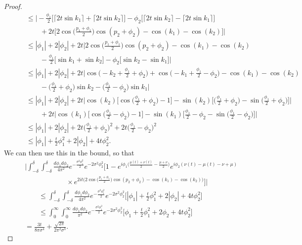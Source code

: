 \documentclass[../thesis-main/thesis-main]{subfiles}
\begin{document}
\begin{proof}
\begin{align}
  & \qquad \leq \bigg|-\frac{\phi_1}{2} \big[ \lceil 2 t \sin k_1\rceil + \lceil 2t \sin k_2\rceil \big] - \phi_2 \big[ \lceil 2 t \sin k_2\rceil - \lceil 2t \sin k_1\rceil\big]  \nonumber\\
  &\qquad \qquad + 2 t \Big[ 2 \cos\Big( \frac{p_1 +\phi_1}{2}\Big) \cos(p_2 + \phi_2) - \cos(k_1) - \cos(k_2) \Big]\bigg|\\
  & \qquad \leq |\phi_1| + 2 |\phi_2| + 2 t \bigg| 2\cos\Big( \frac{p_1 +\phi_1}{2}\Big) \cos(p_2 + \phi_2) - \cos(k_1) - \cos(k_2)  \nonumber\\
  & \qquad \qquad - \frac{\phi_1}{2} \big[ \sin k_1 +   \sin k_2\big] - \phi_2 \big[  \sin k_2 -  \sin k_1\big]\bigg|\\
  &  \qquad \leq |\phi_1| + 2 |\phi_2| + 2 t \bigg| \cos\Big(- k_2 + \frac{\phi_1}{2} + \phi_2 \Big)  + \cos\Big(- k_1 + \frac{\phi_1}{2} - \phi_2 \Big)- \cos(k_1) - \cos(k_2)  \nonumber\\
  & \qquad \qquad - \Big(\frac{\phi_1}{2} + \phi_2 \Big)\sin k_2  -\Big(\frac{\phi_1}{2} -  \phi_2\Big) \sin k_1 \bigg|\\
  & \qquad \leq |\phi_1| + 2 |\phi_2| + 2 t \bigg| \cos(k_2) \big[\cos\big( \frac{\phi_1}{2} + \phi_2 \big) - 1\big] - \sin(k_2) \big[\big( \frac{\phi_1}{2} + \phi_2 \big) - \sin\big( \frac{\phi_1}{2} + \phi_2 \big) \big]  \bigg|\nonumber\\
  & \qquad \qquad + 2t \bigg| \cos(k_1) \Big[\cos\Big(\frac{\phi_1}{2} - \phi_2 \Big) - 1 \Big] - \sin(k_1) \Big[ \frac{\phi_1}{2} - \phi_2 - \sin\Big(  \frac{\phi_1}{2} - \phi_2\Big) \Big] \bigg|\\
  & \qquad \leq |\phi_1| + 2 |\phi_2| + 2 t  \Big (\frac{\phi_1}{2} + \phi_2\Big)^2 + 2t \Big( \frac{\phi_1}{2} - \phi_2\Big)^2\\
  & \qquad \leq |\phi_1| +\frac{t}{2} \phi_1^2 + 2 |\phi_2| + 4 t\phi_2^2.
\end{align}
We can then use this in the bound, so that
\begin{align}
  & \Bigg| \int_{-\delta}^\delta \int_{-\delta}^\delta \frac{d\phi_1 d\phi_2}{4\pi^2}  e^{ -\frac{ \sigma^2 \phi_1^2}{2}} e^{ -2\sigma^2 \phi_2^2} \bigg[ 1 - e^{i \phi_1 \big(\frac{\mu(t) + \nu(t)}{2} - \frac{\mu +\nu}{2} \big)} e^{i  \phi_2 (\nu(t) - \mu(t) -\nu + \mu)}\nonumber\\
  & \qquad \qquad \qquad \times e^{ 2 i t\big( 2 \cos\big(\frac{p_1+\phi_1}{2}\big)\cos(p_2+\phi_2) - \cos(k_1) - \cos(k_2)\big)}\bigg] \Bigg|\nonumber\\
  & \qquad \leq  \int_{-\delta}^\delta \int_{-\delta}^\delta \frac{d\phi_1 d\phi_2}{4\pi^2}  e^{ -\frac{ \sigma^2 \phi_1^2}{2}} e^{ -2\sigma^2 \phi_2^2} \Big[|\phi_1| + \frac{t}{2} \phi_1^2 + 2 |\phi_2| + 4 t \phi_2^2 \Big]\\
  & \qquad \leq  \int_{0}^\infty \int_{0}^\infty \frac{d\phi_1 d\phi_2}{\pi^2}  e^{ -\frac{ \sigma^2 \phi_1^2}{2}} e^{ -2\sigma^2 \phi_2^2} \Big[\phi_1 + \frac{t}{2} \phi_1^2 + 2 \phi_2+ 4 t \phi_2^2 \Big]\\
  & = \frac{3 t}{8\pi \sigma^4} + \frac{\sqrt{2\pi}}{2\pi^2 \sigma^3}.
\end{align}


\end{proof}
\end{document}
